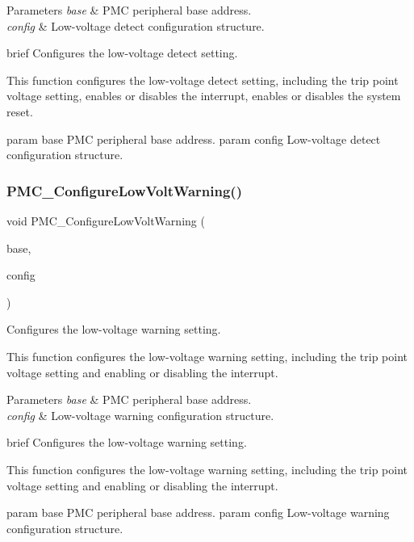 \begin{DoxyParams}{Parameters}
{\em base} & P\+MC peripheral base address. \\
\hline
{\em config} & Low-\/voltage detect configuration structure.\\
\hline
\end{DoxyParams}
brief Configures the low-\/voltage detect setting.

This function configures the low-\/voltage detect setting, including the trip point voltage setting, enables or disables the interrupt, enables or disables the system reset.

param base P\+MC peripheral base address. param config Low-\/voltage detect configuration structure. \mbox{\label{group__pmc_ga711999faa5886861327da2dddadd2277}} 
\subsubsection{\texorpdfstring{PMC\_ConfigureLowVoltWarning()}{PMC\_ConfigureLowVoltWarning()}}
{\footnotesize\ttfamily void P\+M\+C\+\_\+\+Configure\+Low\+Volt\+Warning (\begin{DoxyParamCaption}\item[{\mbox{\hyperlink{struct_p_m_c___type}{P\+M\+C\+\_\+\+Type}} $\ast$}]{base,  }\item[{const \mbox{\hyperlink{group__pmc_ga8e06305a65f64f60fa3290e2d09123f7}{pmc\+\_\+low\+\_\+volt\+\_\+warning\+\_\+config\+\_\+t}} $\ast$}]{config }\end{DoxyParamCaption})}



Configures the low-\/voltage warning setting. 

This function configures the low-\/voltage warning setting, including the trip point voltage setting and enabling or disabling the interrupt.


\begin{DoxyParams}{Parameters}
{\em base} & P\+MC peripheral base address. \\
\hline
{\em config} & Low-\/voltage warning configuration structure.\\
\hline
\end{DoxyParams}
brief Configures the low-\/voltage warning setting.

This function configures the low-\/voltage warning setting, including the trip point voltage setting and enabling or disabling the interrupt.

param base P\+MC peripheral base address. param config Low-\/voltage warning configuration structure. 